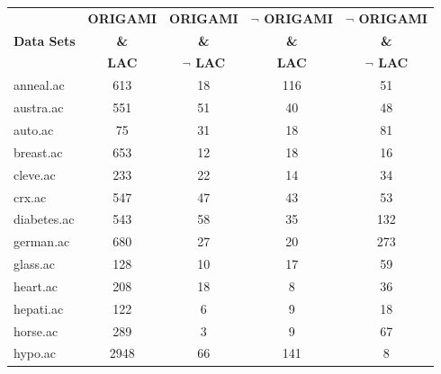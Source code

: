 \begin{table}[htbp]
	\centering
		\begin{tabular}{|l|c|c|c|c|}
		\hline
				& \textbf{ORIGAMI}	& \textbf{ORIGAMI}		& \textbf{$\neg$ ORIGAMI}	& \textbf{$\neg$ ORIGAMI}	\\
		\textbf{Data Sets}	& \textbf{\&}		& \textbf{\&}			& \textbf{\&}			& \textbf{\&}			\\
				&  \textbf{LAC}		& \textbf{$\neg$ LAC}		& \textbf{LAC}			& \textbf{$\neg$ LAC}		\\
		\hline
		anneal.ac       & 613           & 18                 & 116                      & 51                            \\
		\hline
		austra.ac       & 551           & 51                 & 40                       & 48                            \\
		\hline
		auto.ac         & 75            & 31                 & 18                       & 81                            \\
		\hline
		breast.ac       & 653           & 12                 & 18                       & 16                            \\
		\hline
		cleve.ac        & 233           & 22                 & 14                       & 34                            \\
		\hline
		crx.ac          & 547           & 47                 & 43                       & 53                            \\
		\hline
		diabetes.ac     & 543           & 58                 & 35                       & 132                           \\
		\hline
		german.ac       & 680           & 27                 & 20                       & 273                           \\
		\hline
		glass.ac        & 128           & 10                 & 17                       & 59                            \\
		\hline
		heart.ac        & 208           & 18                 & 8                        & 36                            \\
		\hline
		hepati.ac       & 122           & 6                  & 9                        & 18                            \\
		\hline
		horse.ac        & 289           & 3                  & 9                        & 67                            \\
		\hline
		hypo.ac         & 2948          & 66                 & 141                      & 8                             \\

\end{tabular}
\end{table}
